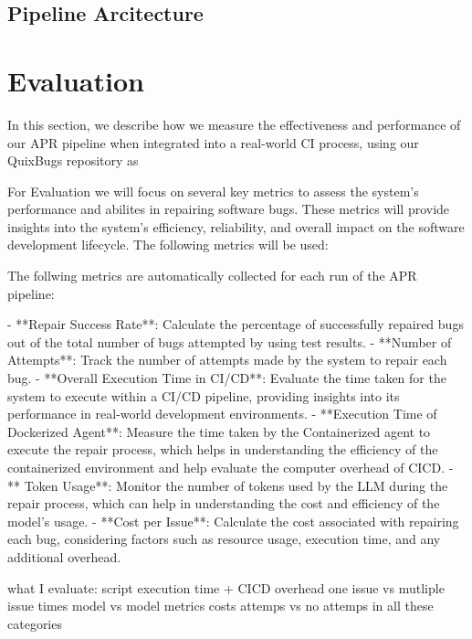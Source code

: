 
\subsection{Pipeline Arcitecture}


\section{Evaluation}

In this section, we describe how we measure the effectiveness and performance of our APR pipeline when integrated into a real-world CI process, using our QuixBugs repository as

For Evaluation we will focus on several key metrics to assess the system's performance and abilites in repairing software bugs. These metrics will provide insights into the system's efficiency, reliability, and overall impact on the software development lifecycle. The following metrics will be used:

The follwing metrics are automatically collected for each run of the APR pipeline:

- **Repair Success Rate**: Calculate the percentage of successfully repaired bugs out of the total number of bugs attempted by using test results.
- **Number of Attempts**: Track the number of attempts made by the system to repair each bug.
- **Overall Execution Time in CI/CD**: Evaluate the time taken for the system to execute within a CI/CD pipeline, providing insights into its performance in real-world development environments.
- **Execution Time of Dockerized Agent**: Measure the time taken by the Containerized agent to execute the repair process, which helps in understanding the efficiency of the containerized environment and help evaluate the computer overhead of CICD.
- ** Token Usage**: Monitor the number of tokens used by the LLM during the repair process, which can help in understanding the cost and efficiency of the model's usage.
- **Cost per Issue**: Calculate the cost associated with repairing each bug, considering factors such as resource usage, execution time, and any additional overhead.



what I evaluate:
script execution time + CICD overhead
one issue vs mutliple issue times
model vs model metrics
costs
attemps vs no attemps in all these categories